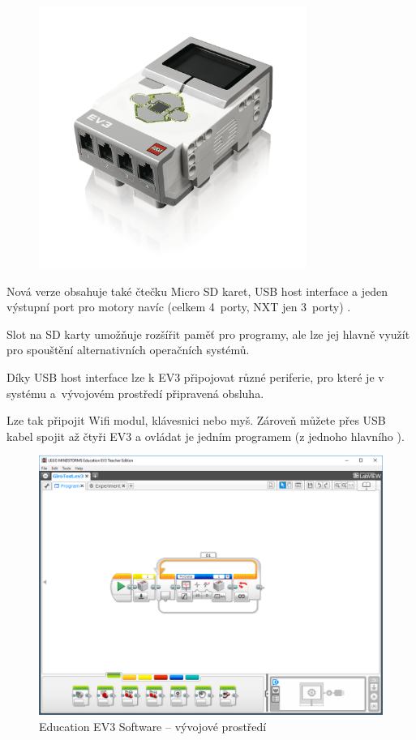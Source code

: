 \begin{figure}[h]
	\centering
	\includegraphics[width=330px]{images/lego-mindstorms-ev3_brick.jpg}
	\caption[]{\legoEV{ \brick}\protect\footnotemark}
	\label{fig:lego-mindstorms-ev3_brick}
\end{figure}


Nová verze obsahuje také čtečku Micro SD karet, USB host interface a jeden výstupní port pro motory navíc (celkem 4~porty, NXT jen 3~porty) \cite{legoBotBench_comparing-EV3-and-NXT}. 

Slot na SD karty umožňuje rozšířit paměť pro programy, ale lze jej hlavně využít pro spouštění alternativních operačních systémů. 

Díky USB host interface lze k EV3 připojovat různé periferie, pro které je v systému a~vývojovém prostředí připravená obsluha.

Lze tak připojit Wifi modul, klávesnici nebo myš. 
Zároveň můžete přes USB kabel spojit až čtyři EV3  a ovládat je jedním programem (z jednoho hlavního ).

\begin{figure}[h]
	\centering
	\includegraphics[width=\textwidth]{images/lego-mindstorms-ev3_dev-soft.png}
	\caption[\legoM{ }Education EV3 Software -- vývojové prostředí]{\legoM{ }Education EV3 Software -- vývojové prostředí}
	\label{fig:lego-mindstorms-ev3_dev-soft}
\end{figure}

